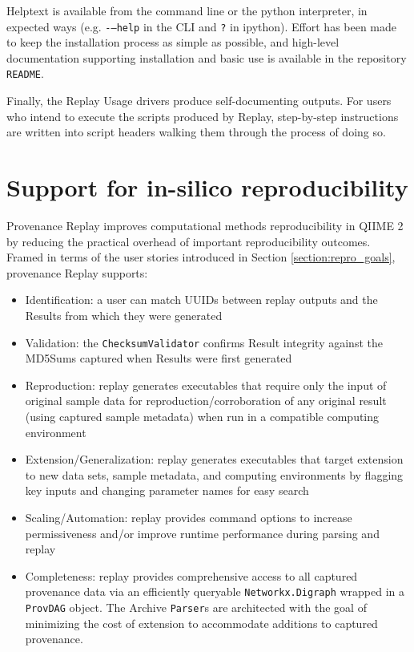 Helptext is available from the command line or the python interpreter, in
expected ways (e.g. \texttt{-–help} in the CLI and \texttt{?} in ipython).
Effort has been made to keep the installation process as simple as possible, and
high-level documentation supporting installation and basic use is available in
the repository \texttt{README}.

Finally, the Replay Usage drivers produce self-documenting outputs. For users
who intend to execute the scripts produced by Replay, step-by-step instructions
are written into script headers walking them through the process of doing so.


\section{Support for in-silico reproducibility}

Provenance Replay improves computational methods reproducibility in QIIME 2 by
reducing the practical overhead of important reproducibility outcomes. Framed in
terms of the user stories introduced in Section \ref{section:repro_goals},
provenance Replay supports:

\begin{itemize}
    \item Identification: a user can match UUIDs between replay outputs and the
        Results from which they were generated
    \item Validation: the \texttt{ChecksumValidator} confirms Result integrity
        against the MD5Sums captured when Results were first generated
    \item Reproduction: replay generates executables that require only the input
        of original sample data for reproduction/corroboration of any original
        result (using captured sample metadata) when run in a compatible computing
        environment
    \item Extension/Generalization: replay generates executables that target
        extension to new data sets, sample metadata, and computing environments by
        flagging key inputs and changing parameter names for easy search
    \item Scaling/Automation: replay provides command options to increase
        permissiveness and/or improve runtime performance during parsing and replay
    \item Completeness: replay provides comprehensive access to all captured
        provenance data via an efficiently queryable \texttt{Networkx.Digraph}
        wrapped in a \texttt{ProvDAG} object. The Archive \texttt{Parser}s are architected
        with the goal of minimizing the cost of extension to accommodate additions
        to captured provenance.
\end{itemize}

